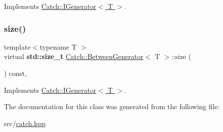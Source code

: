 Implements \hyperlink{struct_catch_1_1_i_generator_ad69e937cb66dba3ed9429c42abf4fce3}{Catch\+::\+I\+Generator$<$ T $>$}.

\mbox{\label{class_catch_1_1_between_generator_af65a1fe51f9b1106fc676e3dd189adb6}} 
\subsubsection{\texorpdfstring{size()}{size()}}
{\footnotesize\ttfamily template$<$typename T $>$ \\
virtual \textbf{ std\+::size\+\_\+t} \hyperlink{class_catch_1_1_between_generator}{Catch\+::\+Between\+Generator}$<$ T $>$\+::size (\begin{DoxyParamCaption}{ }\end{DoxyParamCaption}) const\hspace{0.3cm}{\ttfamily [inline]}, {\ttfamily [virtual]}}



Implements \hyperlink{struct_catch_1_1_i_generator_a2e317253b03e838b6065ce69719a198e}{Catch\+::\+I\+Generator$<$ T $>$}.



The documentation for this class was generated from the following file\+:\begin{DoxyCompactItemize}
\item 
src/\hyperlink{catch_8hpp}{catch.\+hpp}\end{DoxyCompactItemize}
